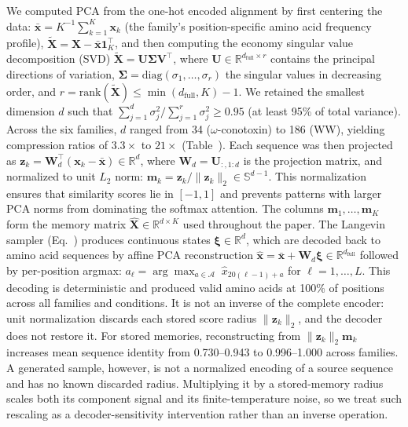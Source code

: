 We computed PCA from the one-hot encoded alignment by first centering the data:
$\bar{\mathbf{x}} = K^{-1}\sum_{k=1}^K \mathbf{x}_k$ (the family's
position-specific amino acid frequency profile),
$\tilde{\mathbf{X}} = \mathbf{X} - \bar{\mathbf{x}}\mathbf{1}_K^\top$,
and then computing the economy singular value decomposition (SVD)
$\tilde{\mathbf{X}} = \mathbf{U}\boldsymbol{\Sigma}\mathbf{V}^\top$, where
$\mathbf{U} \in \mathbb{R}^{d_{\mathrm{full}} \times r}$ contains the
principal directions of variation,
$\boldsymbol{\Sigma} = \mathrm{diag}(\sigma_1, \ldots, \sigma_r)$ the
singular values in decreasing order, and
$r = \mathrm{rank}(\tilde{\mathbf{X}}) \leq \min(d_{\mathrm{full}}, K) - 1$.
We retained the smallest dimension $d$ such that
$\sum_{j=1}^d \sigma_j^2 / \sum_{j=1}^r \sigma_j^2 \geq 0.95$ (at least
95\% of total variance). Across the six families, $d$ ranged from 34
($\omega$-conotoxin) to 186 (WW), yielding compression ratios of
$3.3\times$ to $21\times$ (Table~). Each sequence was
then projected as
$\mathbf{z}_k = \mathbf{W}_d^\top(\mathbf{x}_k - \bar{\mathbf{x}})
\in \mathbb{R}^d$, where
$\mathbf{W}_d = \mathbf{U}_{:,1:d}$ is the projection matrix, and
normalized to unit $L_2$ norm:
$\mathbf{m}_k = \mathbf{z}_k / \|\mathbf{z}_k\|_2 \in \mathbb{S}^{d-1}$.
This normalization ensures that similarity scores lie in $[-1, 1]$ and
prevents patterns with larger PCA norms from dominating the softmax attention.
The columns $\mathbf{m}_1, \ldots, \mathbf{m}_K$ form the memory matrix
$\hat{\mathbf{X}} \in \mathbb{R}^{d \times K}$ used throughout the paper.
The Langevin sampler (Eq.~) produces continuous states
$\boldsymbol{\xi} \in \mathbb{R}^d$, which are decoded back to amino acid
sequences by affine PCA reconstruction
$\hat{\mathbf{x}} = \bar{\mathbf{x}} + \mathbf{W}_d\boldsymbol{\xi}
\in \mathbb{R}^{d_{\mathrm{full}}}$ followed by per-position argmax:
$a_\ell = \arg\max_{a \in \mathcal{A}}\; \hat{x}_{20(\ell-1) + a}$ for
$\ell = 1, \ldots, L$. This decoding is deterministic and produced valid
amino acids at 100\% of positions across all families and conditions. It is
not an inverse of the complete encoder: unit normalization discards each
stored score radius $\|\mathbf{z}_k\|_2$, and the decoder does not restore it.
For stored memories, reconstructing from
$\|\mathbf{z}_k\|_2\mathbf{m}_k$ increases mean sequence identity from
0.730--0.943 to 0.996--1.000 across families. A generated sample, however, is
not a normalized encoding of a source sequence and has no known discarded
radius. Multiplying it by a stored-memory radius scales both its component
signal and its finite-temperature noise, so we treat such rescaling as a
decoder-sensitivity intervention rather than an inverse operation.

